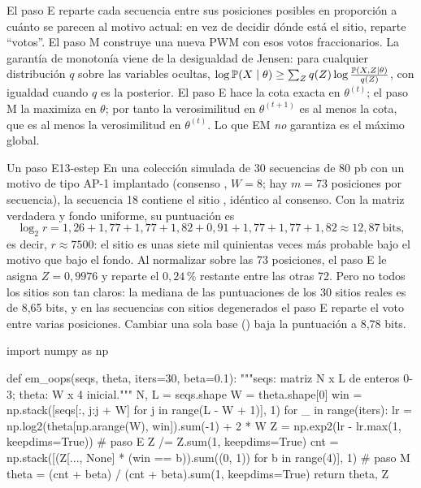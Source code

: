 \begin{simbolos}
\end{simbolos}

El paso E reparte cada secuencia entre sus posiciones posibles en proporción a cuánto se parecen al motivo actual: en vez de decidir dónde está el sitio, reparte ``votos''. El paso M construye una nueva PWM con esos votos fraccionarios. La garantía de monotonía viene de la desigualdad de Jensen: para cualquier distribución $q$ sobre las variables ocultas, $\log\mathbb{P}(X\mid\theta)\ge\sum_Z q(Z)\log\frac{\mathbb{P}(X,Z\mid\theta)}{q(Z)}$, con igualdad cuando $q$ es la posterior. El paso E hace la cota exacta en $\theta^{(t)}$; el paso M la maximiza en $\theta$; por tanto la verosimilitud en $\theta^{(t+1)}$ es al menos la cota, que es al menos la verosimilitud en $\theta^{(t)}$. Lo que EM \emph{no} garantiza es el máximo global.

\begin{ejemplo}{Un paso E}{13-estep}
En una colección simulada de 30 secuencias de 80 pb con un motivo de tipo AP-1 implantado (consenso , $W=8$; hay $m=73$ posiciones por secuencia), la secuencia 18 contiene el sitio , idéntico al consenso. Con la matriz verdadera y fondo uniforme, su puntuación es
\[
\log_2 r = 1{,}26+1{,}77+1{,}77+1{,}82+0{,}91+1{,}77+1{,}77+1{,}82 \approx 12{,}87\ \text{bits},
\]
es decir, $r\approx 7500$: el sitio es unas siete mil quinientas veces más probable bajo el motivo que bajo el fondo. Al normalizar sobre las 73 posiciones, el paso E le asigna $Z=0{,}9976$ y reparte el $0{,}24\,\%$ restante entre las otras 72. Pero no todos los sitios son tan claros: la mediana de las puntuaciones de los 30 sitios reales es de 8,65 bits, y en las secuencias con sitios degenerados el paso E reparte el voto entre varias posiciones. Cambiar una sola base () baja la puntuación a 8,78 bits.
\end{ejemplo}

\begin{codigo}[em\_oops.py]
import numpy as np

def em_oops(seqs, theta, iters=30, beta=0.1):
    """seqs: matriz N x L de enteros 0-3; theta: W x 4 inicial."""
    N, L = seqs.shape
    W = theta.shape[0]
    win = np.stack([seqs[:, j:j + W] for j in range(L - W + 1)], 1)
    for _ in range(iters):
        lr = np.log2(theta[np.arange(W), win]).sum(-1) + 2 * W
        Z = np.exp2(lr - lr.max(1, keepdims=True))     # paso E
        Z /= Z.sum(1, keepdims=True)
        cnt = np.stack([(Z[..., None] * (win == b)).sum((0, 1))
                        for b in range(4)], 1)         # paso M
        theta = (cnt + beta) / (cnt + beta).sum(1, keepdims=True)
    return theta, Z
\end{codigo}

